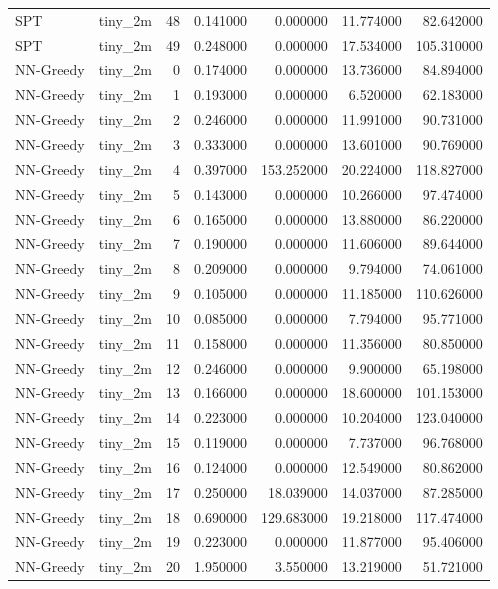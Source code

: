 \begin{tabular}{llrrrrr}
SPT & tiny_2m & 48 & 0.141000 & 0.000000 & 11.774000 & 82.642000 \\
SPT & tiny_2m & 49 & 0.248000 & 0.000000 & 17.534000 & 105.310000 \\
NN-Greedy & tiny_2m & 0 & 0.174000 & 0.000000 & 13.736000 & 84.894000 \\
NN-Greedy & tiny_2m & 1 & 0.193000 & 0.000000 & 6.520000 & 62.183000 \\
NN-Greedy & tiny_2m & 2 & 0.246000 & 0.000000 & 11.991000 & 90.731000 \\
NN-Greedy & tiny_2m & 3 & 0.333000 & 0.000000 & 13.601000 & 90.769000 \\
NN-Greedy & tiny_2m & 4 & 0.397000 & 153.252000 & 20.224000 & 118.827000 \\
NN-Greedy & tiny_2m & 5 & 0.143000 & 0.000000 & 10.266000 & 97.474000 \\
NN-Greedy & tiny_2m & 6 & 0.165000 & 0.000000 & 13.880000 & 86.220000 \\
NN-Greedy & tiny_2m & 7 & 0.190000 & 0.000000 & 11.606000 & 89.644000 \\
NN-Greedy & tiny_2m & 8 & 0.209000 & 0.000000 & 9.794000 & 74.061000 \\
NN-Greedy & tiny_2m & 9 & 0.105000 & 0.000000 & 11.185000 & 110.626000 \\
NN-Greedy & tiny_2m & 10 & 0.085000 & 0.000000 & 7.794000 & 95.771000 \\
NN-Greedy & tiny_2m & 11 & 0.158000 & 0.000000 & 11.356000 & 80.850000 \\
NN-Greedy & tiny_2m & 12 & 0.246000 & 0.000000 & 9.900000 & 65.198000 \\
NN-Greedy & tiny_2m & 13 & 0.166000 & 0.000000 & 18.600000 & 101.153000 \\
NN-Greedy & tiny_2m & 14 & 0.223000 & 0.000000 & 10.204000 & 123.040000 \\
NN-Greedy & tiny_2m & 15 & 0.119000 & 0.000000 & 7.737000 & 96.768000 \\
NN-Greedy & tiny_2m & 16 & 0.124000 & 0.000000 & 12.549000 & 80.862000 \\
NN-Greedy & tiny_2m & 17 & 0.250000 & 18.039000 & 14.037000 & 87.285000 \\
NN-Greedy & tiny_2m & 18 & 0.690000 & 129.683000 & 19.218000 & 117.474000 \\
NN-Greedy & tiny_2m & 19 & 0.223000 & 0.000000 & 11.877000 & 95.406000 \\
NN-Greedy & tiny_2m & 20 & 1.950000 & 3.550000 & 13.219000 & 51.721000 \\

\end{tabular}
